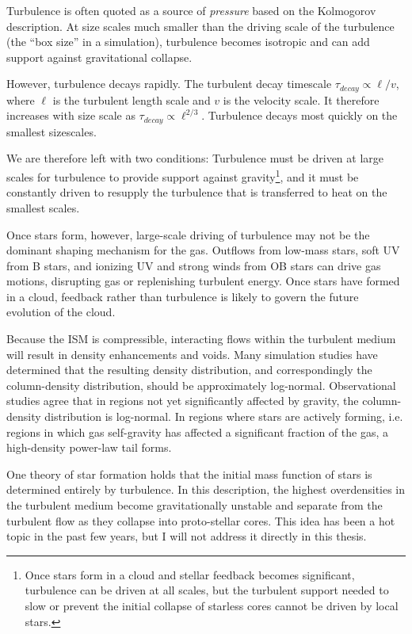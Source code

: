 Turbulence is often quoted as a source of \emph{pressure} based on the
Kolmogorov description.  At size scales much smaller than the driving scale of
the turbulence (the ``box size'' in a simulation), turbulence becomes isotropic
and can add support against gravitational collapse.  

However, turbulence decays rapidly.  The turbulent decay timescale
$\tau_{decay}\propto \ell / v$, where $\ell$ is the turbulent length scale and $v$ is
the velocity scale.  It therefore increases with size scale as
$\tau_{decay}\propto \ell^{2/3}$.  Turbulence decays most quickly on the smallest
sizescales.

We are therefore left with two conditions: Turbulence must be driven at large
scales for turbulence to provide support against gravity\footnote{Once stars form
in a cloud and stellar feedback becomes significant, turbulence can be driven at all
scales, but the turbulent support needed to slow or prevent the initial
collapse of starless cores cannot be driven by local stars.}, and it must be
constantly driven to resupply the turbulence that is transferred to heat on the
smallest scales.

Once stars form, however, large-scale driving of turbulence may not be the
dominant shaping mechanism for the gas.  Outflows from low-mass stars, soft UV
from B stars, and ionizing UV and strong winds from OB stars can drive gas
motions, disrupting gas or replenishing turbulent energy.  Once stars have
formed in a cloud, feedback rather than turbulence is likely to govern the
future evolution of the cloud.

Because the ISM is compressible, interacting flows within the turbulent medium
will result in density enhancements and voids.  Many simulation studies have
determined that the resulting density distribution, and correspondingly the
column-density distribution, should be approximately log-normal.  Observational
studies agree that in regions not yet significantly affected by gravity, the 
column-density distribution is log-normal.  In regions where stars are actively
forming, i.e. regions in which gas self-gravity has affected a significant fraction
of the gas, a high-density power-law tail forms.

One theory of star formation holds that the initial mass function of stars is
determined entirely by turbulence.  In this description, the highest
overdensities in the turbulent medium become gravitationally unstable and
separate from the turbulent flow as they collapse into proto-stellar cores.
This idea has been a hot topic in the past few years, but I will not address
it directly in this thesis.

